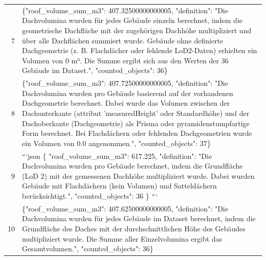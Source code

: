 \documentclass[a4paper,11pt]{article}
\begin{document}
\begin{table}[ht]
\begin{tabular}{r p{12cm}}
7 & 
\{"roof\_volume\_sum\_m3": 407.32500000000005, "definition": "Die Dachvolumina wurden für jedes Gebäude einzeln berechnet, indem die geometrische Dachfläche mit der zugehörigen Dachhöhe multipliziert und über alle Dachflächen summiert wurde. Gebäude ohne definierte Dachgeometrie (z. B. Flachdächer oder fehlende LoD2-Daten) erhielten ein Volumen von 0 m³. Die Summe ergibt sich aus den Werten der 36 Gebäude im Dataset.", "counted\_objects": 36\} \\
8 & \{"roof\_volume\_sum\_m3": 407.72500000000005, "definition": "Die Dachvolumina wurden pro Gebäude basierend auf der vorhandenen Dachgeometrie berechnet. Dabei wurde das Volumen zwischen der Dachunterkante (attribut 'measuredHeight' oder Standardhöhe) und der Dachoberkante (Dachgeometrie) als Prisma oder pyramidenstumpfartige Form berechnet. Bei Flachdächern oder fehlenden Dachgeometrien wurde ein Volumen von 0.0 angenommen.", "counted\_objects": 37\} \\
9 & ```json
\{
  "roof\_volume\_sum\_m3": 617.225,
  "definition": "Die Dachvolumina wurden pro Gebäude berechnet, indem die Grundfläche (LoD 2) mit der gemessenen Dachhöhe multipliziert wurde. Dabei wurden Gebäude mit Flachdächern (kein Volumen) und Satteldächern berücksichtigt.",
  "counted\_objects": 36
\}
``` \\
10 & \{"roof\_volume\_sum\_m3": 407.62500000000005, "definition": "Die Dachvolumina wurden für jedes Gebäude im Dataset berechnet, indem die Grundfläche des Daches mit der durchschnittlichen Höhe des Gebäudes multipliziert wurde. Die Summe aller Einzelvolumina ergibt das Gesamtvolumen.", "counted\_objects": 36\} \\
\hline
\end{tabular}
\end{table}

\clearpage
\end{document}
